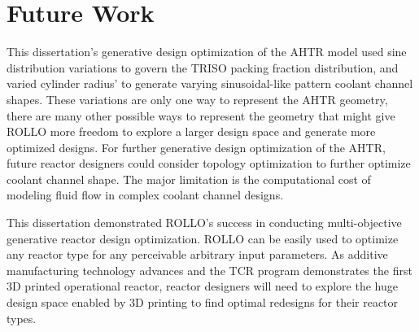 \section{Future Work}
This dissertation's generative design optimization of the \gls{AHTR} model used sine 
distribution variations to govern the \gls{TRISO} packing fraction distribution, and  
varied cylinder radius' to generate varying sinusoidal-like pattern coolant channel 
shapes. 
These variations are only one way to represent the \gls{AHTR} geometry, there are many 
other possible ways to represent the geometry that might give \gls{ROLLO} more freedom 
to explore a larger design space and generate more optimized designs. 
For further generative design optimization of the \gls{AHTR}, future reactor designers 
could consider topology optimization to further optimize coolant channel shape. 
The major limitation is the computational cost of modeling fluid flow in complex 
coolant channel designs. 

This dissertation demonstrated \gls{ROLLO}'s success in conducting multi-objective 
generative reactor design optimization. 
\gls{ROLLO} can be easily used to optimize any reactor type for any perceivable 
arbitrary input parameters. 
As additive manufacturing technology advances and the \gls{TCR} program 
demonstrates the first 3D printed operational reactor, reactor designers 
will need to explore the huge design space enabled by 3D printing to find optimal 
redesigns for their reactor types. 






